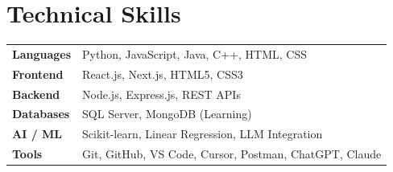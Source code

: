 \section*{Technical Skills}

\begin{tabularx}{\textwidth}{@{}lX@{}}
\textbf{Languages} & Python, JavaScript, Java, C++, HTML, CSS \\
\textbf{Frontend} & React.js, Next.js, HTML5, CSS3 \\
\textbf{Backend} & Node.js, Express.js, REST APIs \\
\textbf{Databases} & SQL Server, MongoDB (Learning) \\
\textbf{AI / ML} & Scikit-learn, Linear Regression, LLM Integration \\
\textbf{Tools} & Git, GitHub, VS Code, Cursor, Postman, ChatGPT, Claude \\
\end{tabularx}